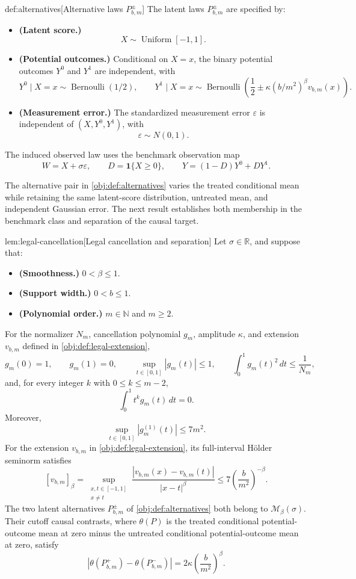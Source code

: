 \begin{definitionv}{def:alternatives}[Alternative laws \(P^\pm_{b,m}\)]
The latent laws \(P^\pm_{b,m}\) are specified by:
\begin{itemize}
\item \textbf{(Latent score.)}
\[
X\sim\operatorname{Uniform}[-1,1].
\]
\item \textbf{(Potential outcomes.)} Conditional on \(X=x\), the binary potential outcomes \(Y^0\) and \(Y^1\) are independent, with
\[
Y^0\mid X=x\sim\operatorname{Bernoulli}(1/2),
\qquad
Y^1\mid X=x\sim
\operatorname{Bernoulli}\!\left(
\frac12\pm\kappa(b/m^2)^\beta v_{b,m}(x)
\right).
\]
\item \textbf{(Measurement error.)} The standardized measurement error \(\varepsilon\) is independent of \((X,Y^0,Y^1)\), with
\[
\varepsilon\sim N(0,1).
\]
\end{itemize}
The induced observed law uses the benchmark observation map
\[
W=X+\sigma\varepsilon,\qquad
D=\mathbf1\{X\ge0\},\qquad
Y=(1-D)Y^0+DY^1.
\]
\end{definitionv}

The alternative pair  in \cref{obj:def:alternatives} varies the treated conditional mean while retaining the same latent-score distribution, untreated mean, and independent Gaussian error. The next result establishes both membership in the benchmark class and separation of the causal target.

\begin{lemmav}{lem:legal-cancellation}[Legal cancellation and separation]
Let \(\sigma\in\mathbb R\), and suppose that:
\begin{itemize}
\item \textbf{(Smoothness.)} \(0<\beta\le1\).
\item \textbf{(Support width.)} \(0<b\le1\).
\item \textbf{(Polynomial order.)} \(m\in\mathbb N\) and \(m\ge2\).
\end{itemize}
For the normalizer \(N_m\), cancellation polynomial \(g_m\), amplitude \(\kappa\), and extension \(v_{b,m}\) defined in \cref{obj:def:legal-extension},
\[
g_m(0)=1,\qquad g_m(1)=0,\qquad
\sup_{t\in[0,1]}|g_m(t)|\le1,\qquad
\int_0^1g_m(t)^2\,dt\le\frac1{N_m},
\]
and, for every integer \(k\) with \(0\le k\le m-2\),
\[
\int_0^1t^kg_m(t)\,dt=0.
\]
Moreover,
\[
\sup_{t\in[0,1]}|g_m^{(1)}(t)|\le7m^2.
\]
For the extension \(v_{b,m}\) in \cref{obj:def:legal-extension}, its full-interval Hölder seminorm satisfies
\[
[v_{b,m}]_\beta
=
\sup_{\substack{x,t\in[-1,1]\\x\ne t}}
\frac{|v_{b,m}(x)-v_{b,m}(t)|}{|x-t|^\beta}
\le7\left(\frac{b}{m^2}\right)^{-\beta}.
\]
The two latent alternatives \(P^\pm_{b,m}\) of \cref{obj:def:alternatives} both belong to \(\mathcal M_\beta(\sigma)\). Their cutoff causal contrasts, where \(\theta(P)\) is the treated conditional potential-outcome mean at zero minus the untreated conditional potential-outcome mean at zero, satisfy
\[
\left|\theta(P^+_{b,m})-\theta(P^-_{b,m})\right|
=
2\kappa\left(\frac{b}{m^2}\right)^\beta.
\]
\end{lemmav}

